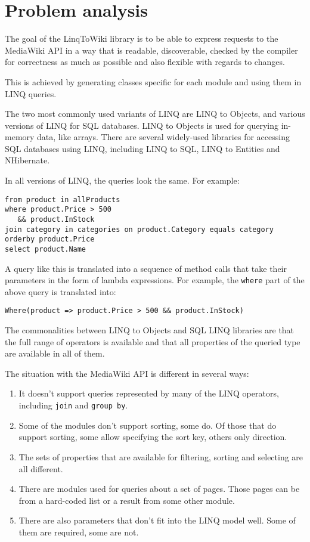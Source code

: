 \chapter{Problem analysis}
\label{goal}

The goal of the LinqToWiki library is to be able to express requests to the MediaWiki \ac{API}
in a way that is readable, discoverable, checked by the compiler for correctness as much as possible and also flexible with regards to changes.

This is achieved by generating classes specific for each module and using them in LINQ queries.

The two most commonly used variants of \ac{LINQ} are LINQ to Objects, and various versions of LINQ for \ac{SQL} databases.
LINQ to Objects is used for querying in-memory data, like arrays.
There are several widely-used libraries for accessing \ac{SQL} databases using LINQ, including LINQ to SQL, LINQ to Entities and NHibernate.

In all versions of \ac{LINQ}, the queries look the same. For example:

\begin{lstlisting}
from product in allProducts
where product.Price > 500
   && product.InStock
join category in categories on product.Category equals category
orderby product.Price
select product.Name
\end{lstlisting}

A query like this is translated into a sequence of method calls that take their parameters in the form of lambda expressions.
For example, the \lstinline{where} part of the above query is translated into:

\begin{lstlisting}
Where(product => product.Price > 500 && product.InStock)
\end{lstlisting}

The commonalities between LINQ to Objects and SQL LINQ libraries are that the full range of operators is available
and that all properties of the queried type are available in all of them.

The situation with the MediaWiki \ac{API} is different in several ways:

\begin{enumerate}
\item It doesn't support queries represented by many of the LINQ operators, including \lstinline{join} and \lstinline{group by}.
\item Some of the modules don't support sorting, some do. Of those that do support sorting, some allow specifying the sort key, others only direction.
\item The sets of properties that are available for filtering, sorting and selecting are all different.
\item There are modules used for queries about a set of pages. Those pages can be from a hard-coded list or a result from some other module.
\item There are also parameters that don't fit into the LINQ model well. Some of them are required, some are not.
\end{enumerate}

